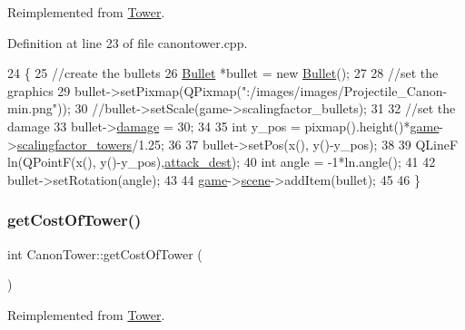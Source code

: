 Reimplemented from \hyperlink{class_tower_aa0c9c780f48cffacd3da6877f5d4fdc2}{Tower}.



Definition at line 23 of file canontower.\+cpp.


\begin{DoxyCode}
24 \{
25     \textcolor{comment}{//create the bullets}
26     \hyperlink{class_bullet}{Bullet} *bullet = \textcolor{keyword}{new} \hyperlink{class_bullet}{Bullet}();
27 
28     \textcolor{comment}{//set the graphics}
29     bullet->setPixmap(QPixmap(\textcolor{stringliteral}{":/images/images/Projectile\_Canon-min.png"}));
30     \textcolor{comment}{//bullet->setScale(game->scalingfactor\_bullets);}
31 
32     \textcolor{comment}{//set the damage}
33     bullet->\hyperlink{class_bullet_a733d2ebbf9143c9ca68d3eb7e14121d0}{damage} = 30;
34 
35     \textcolor{keywordtype}{int} y\_pos = pixmap().height()*\hyperlink{canontower_8cpp_a58bdb5643d0814ac4e697a1564b79b70}{game}->\hyperlink{class_game_a6c1ca48f17f6934432d01bfa7f762a04}{scalingfactor\_towers}/1.25;
36 
37     bullet->setPos(x(), y()-y\_pos);
38 
39     QLineF ln(QPointF(x(), y()-y\_pos),\hyperlink{class_tower_a2b3e8ab90ccceed1fa3a667db80c2c06}{attack\_dest});
40     \textcolor{keywordtype}{int} angle = -1*ln.angle();
41 
42     bullet->setRotation(angle);
43 
44     \hyperlink{canontower_8cpp_a58bdb5643d0814ac4e697a1564b79b70}{game}->\hyperlink{class_game_a8119e3b9a632906c6808fa294b46a92a}{scene}->addItem(bullet);
45 
46 \}
\end{DoxyCode}
\mbox{\label{class_canon_tower_ac0e57d350da509e89e926afe950ab291}} 
\subsubsection{\texorpdfstring{get\+Cost\+Of\+Tower()}{getCostOfTower()}}
{\footnotesize\ttfamily int Canon\+Tower\+::get\+Cost\+Of\+Tower (\begin{DoxyParamCaption}{ }\end{DoxyParamCaption})\hspace{0.3cm}{\ttfamily [virtual]}}



Reimplemented from \hyperlink{class_tower_ae1d3f44d0149c8146ccf6b262a52ddad}{Tower}.



